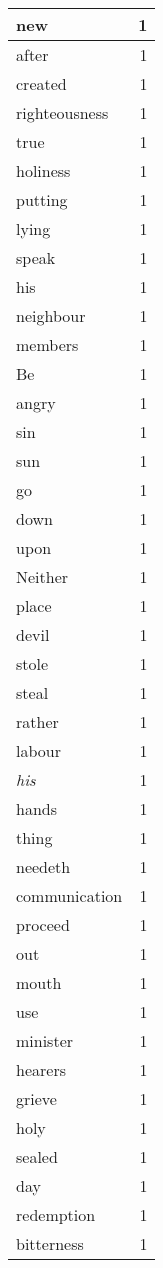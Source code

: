 \begin{center}
\begin{longtable}{l|r}
new & 1\\ \hline 
after & 1\\ \hline 
created & 1\\ \hline 
righteousness & 1\\ \hline 
true & 1\\ \hline 
holiness & 1\\ \hline 
putting & 1\\ \hline 
lying & 1\\ \hline 
speak & 1\\ \hline 
his & 1\\ \hline 
neighbour & 1\\ \hline 
members & 1\\ \hline 
Be & 1\\ \hline 
angry & 1\\ \hline 
sin & 1\\ \hline 
sun & 1\\ \hline 
go & 1\\ \hline 
down & 1\\ \hline 
upon & 1\\ \hline 
Neither & 1\\ \hline 
place & 1\\ \hline 
devil & 1\\ \hline 
stole & 1\\ \hline 
steal & 1\\ \hline 
rather & 1\\ \hline 
labour & 1\\ \hline 
\emph{his} & 1\\ \hline 
hands & 1\\ \hline 
thing & 1\\ \hline 
needeth & 1\\ \hline 
communication & 1\\ \hline 
proceed & 1\\ \hline 
out & 1\\ \hline 
mouth & 1\\ \hline 
use & 1\\ \hline 
minister & 1\\ \hline 
hearers & 1\\ \hline 
grieve & 1\\ \hline 
holy & 1\\ \hline 
sealed & 1\\ \hline 
day & 1\\ \hline 
redemption & 1\\ \hline 
bitterness & 1\\ \hline 

\end{longtable}
\end{center}
